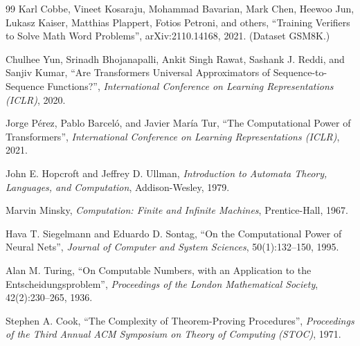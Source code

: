 \begin{thebibliography}{99}
     Karl Cobbe, Vineet Kosaraju, Mohammad Bavarian, Mark Chen, Heewoo Jun, Lukasz Kaiser, Matthias Plappert, Fotios Petroni, and others, ``Training Verifiers to Solve Math Word Problems'', arXiv:2110.14168, 2021. (Dataset GSM8K.)

     Chulhee Yun, Srinadh Bhojanapalli, Ankit Singh Rawat, Sashank J. Reddi, and Sanjiv Kumar, ``Are Transformers Universal Approximators of Sequence-to-Sequence Functions?'', \emph{International Conference on Learning Representations (ICLR)}, 2020.

     Jorge P\'erez, Pablo Barcel\'o, and Javier Mar\'ia Tur, ``The Computational Power of Transformers'', \emph{International Conference on Learning Representations (ICLR)}, 2021.

     John E. Hopcroft and Jeffrey D. Ullman, \emph{Introduction to Automata Theory, Languages, and Computation}, Addison-Wesley, 1979.

     Marvin Minsky, \emph{Computation: Finite and Infinite Machines}, Prentice-Hall, 1967.

     Hava T. Siegelmann and Eduardo D. Sontag, ``On the Computational Power of Neural Nets'', \emph{Journal of Computer and System Sciences}, 50(1):132--150, 1995.

     Alan M. Turing, ``On Computable Numbers, with an Application to the Entscheidungsproblem'', \emph{Proceedings of the London Mathematical Society}, 42(2):230--265, 1936.

     Stephen A. Cook, ``The Complexity of Theorem-Proving Procedures'', \emph{Proceedings of the Third Annual ACM Symposium on Theory of Computing (STOC)}, 1971.

\end{thebibliography}